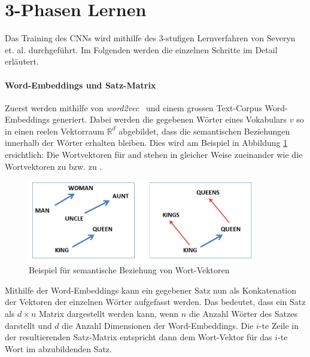 \section{3-Phasen Lernen}

Das Training des CNNs wird mithilfe des 3-stufigen Lernverfahren von Severyn et. al. \cite{Severyn:2015kta} durchgeführt. Im Folgenden werden die einzelnen Schritte im Detail erläutert.

\paragraph{Word-Embeddings und Satz-Matrix} Zuerst werden mithilfe von \emph{word2vec}~\cite{mikolov2013distributed} und einem grossen Text-Corpus Word-Embeddings generiert. Dabei werden die gegebenen Wörter eines Vokabulars $v$ so in einen reelen Vektorraum $\mathbb{R}^d$ abgebildet, dass die semantischen Beziehungen innerhalb der Wörter erhalten bleiben. Dies wird am Beispiel in Abbildung \ref{fig:king_queen_example} ersichtlich: Die Wortvektoren für  and  stehen in gleicher Weise zueinander wie die Wortvektoren  zu  bzw.  zu .

\begin{figure}[H]
  \label{fig:king_queen_example}
  \centering
  \includegraphics[width=10cm]{img/king_queen_example_word_embeddings}
  \caption{Beispiel für semantische Beziehung von Wort-Vektoren}
\end{figure}

Mithilfe der Word-Embeddings kann ein gegebener Satz nun als Konkatenation der Vektoren der einzelnen Wörter aufgefasst werden. Das bedeutet, dass ein Satz als $d \times n$ Matrix dargestellt werden kann, wenn $n$ die Anzahl Wörter des Satzes darstellt und $d$ die Anzahl Dimensionen der Word-Embeddings. Die $i$-te Zeile in der resultierenden Satz-Matrix entspricht dann dem Wort-Vektor für das $i$-te Wort im abzubildenden Satz.

